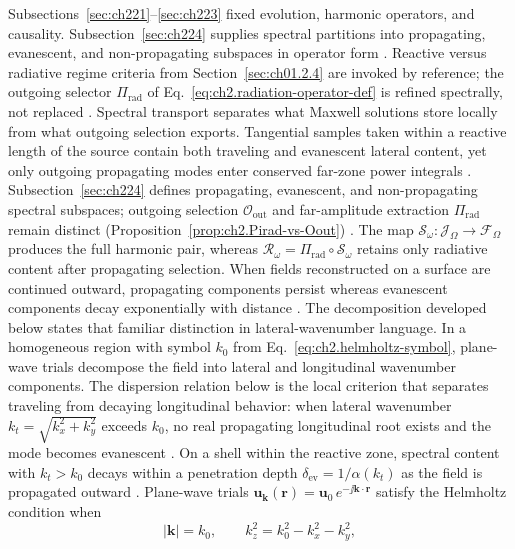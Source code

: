 Subsections~\ref{sec:ch221}--\ref{sec:ch223} fixed evolution, harmonic operators, and
causality. Subsection~\ref{sec:ch224} supplies spectral partitions into propagating,
evanescent, and non-propagating subspaces in operator form \cite{stratton1941}.
Reactive versus radiative regime criteria from Section~\ref{sec:ch01.2.4} are invoked by
reference; the outgoing selector $\Pi_{\mathrm{rad}}$ of
Eq.~\eqref{eq:ch2.radiation-operator-def} is refined spectrally, not replaced
\cite{poynting1884}.
Spectral transport separates what Maxwell solutions store locally from what outgoing
selection exports. Tangential samples taken within a reactive length of the source
contain both traveling and evanescent lateral content, yet only outgoing propagating modes
enter conserved far-zone power integrals \cite{stratton1941,poynting1884}.
Subsection~\ref{sec:ch224} defines propagating, evanescent, and non-propagating spectral
subspaces; outgoing selection $\mathcal{O}_{\mathrm{out}}$ and far-amplitude extraction
$\Pi_{\mathrm{rad}}$ remain distinct (Proposition~\ref{prop:ch2.Pirad-vs-Oout})
\cite{harrington2001}. The map $\mathcal{S}_\omega:\mathcal{J}_\Omega\to\mathcal{F}_\Omega$
produces the full harmonic pair, whereas $\mathcal{R}_\omega=\Pi_{\mathrm{rad}}\circ\mathcal{S}_\omega$
retains only radiative content after propagating selection. When fields reconstructed on a
surface are continued outward, propagating components persist whereas evanescent components
decay exponentially with distance \cite{hansen1988}. The decomposition developed below
states that familiar distinction in lateral-wavenumber language.
In a homogeneous region with symbol \(k_0\) from Eq.~\eqref{eq:ch2.helmholtz-symbol},
plane-wave trials decompose the field into lateral and longitudinal wavenumber components.
The dispersion relation below is the local criterion that
separates traveling from decaying longitudinal behavior: when lateral wavenumber
\(k_t=\sqrt{k_x^2+k_y^2}\) exceeds \(k_0\), no real propagating longitudinal root exists
and the mode becomes evanescent \cite{stratton1941}. On a shell within the reactive zone, spectral content with \(k_t>k_0\)
decays within a penetration depth
\(\delta_{\mathrm{ev}}=1/\alpha(k_t)\) as the field is propagated outward
\cite{hansen1988}. Plane-wave trials \(\mathbf{u}_{\mathbf{k}}(\mathbf{r})=\mathbf{u}_0\,e^{-\jj\mathbf{k}\cdot\mathbf{r}}\)
satisfy the Helmholtz condition when
\begin{equation}
\label{eq:ch2.dispersion-relation}
|\mathbf{k}|=k_0,\qquad
k_z^2=k_0^2-k_x^2-k_y^2,
\end{equation}
